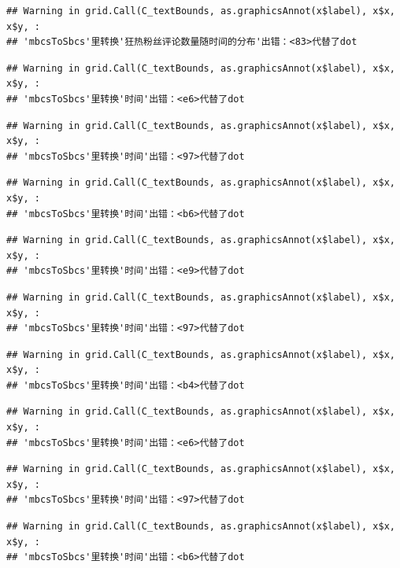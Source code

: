 \documentclass[
]{article}
\begin{document}
\begin{verbatim}
## Warning in grid.Call(C_textBounds, as.graphicsAnnot(x$label), x$x, x$y, :
## 'mbcsToSbcs'里转换'狂热粉丝评论数量随时间的分布'出错：<83>代替了dot
\end{verbatim}

\begin{verbatim}
## Warning in grid.Call(C_textBounds, as.graphicsAnnot(x$label), x$x, x$y, :
## 'mbcsToSbcs'里转换'时间'出错：<e6>代替了dot
\end{verbatim}

\begin{verbatim}
## Warning in grid.Call(C_textBounds, as.graphicsAnnot(x$label), x$x, x$y, :
## 'mbcsToSbcs'里转换'时间'出错：<97>代替了dot
\end{verbatim}

\begin{verbatim}
## Warning in grid.Call(C_textBounds, as.graphicsAnnot(x$label), x$x, x$y, :
## 'mbcsToSbcs'里转换'时间'出错：<b6>代替了dot
\end{verbatim}

\begin{verbatim}
## Warning in grid.Call(C_textBounds, as.graphicsAnnot(x$label), x$x, x$y, :
## 'mbcsToSbcs'里转换'时间'出错：<e9>代替了dot
\end{verbatim}

\begin{verbatim}
## Warning in grid.Call(C_textBounds, as.graphicsAnnot(x$label), x$x, x$y, :
## 'mbcsToSbcs'里转换'时间'出错：<97>代替了dot
\end{verbatim}

\begin{verbatim}
## Warning in grid.Call(C_textBounds, as.graphicsAnnot(x$label), x$x, x$y, :
## 'mbcsToSbcs'里转换'时间'出错：<b4>代替了dot
\end{verbatim}

\begin{verbatim}
## Warning in grid.Call(C_textBounds, as.graphicsAnnot(x$label), x$x, x$y, :
## 'mbcsToSbcs'里转换'时间'出错：<e6>代替了dot
\end{verbatim}

\begin{verbatim}
## Warning in grid.Call(C_textBounds, as.graphicsAnnot(x$label), x$x, x$y, :
## 'mbcsToSbcs'里转换'时间'出错：<97>代替了dot
\end{verbatim}

\begin{verbatim}
## Warning in grid.Call(C_textBounds, as.graphicsAnnot(x$label), x$x, x$y, :
## 'mbcsToSbcs'里转换'时间'出错：<b6>代替了dot
\end{verbatim}
\end{document}
